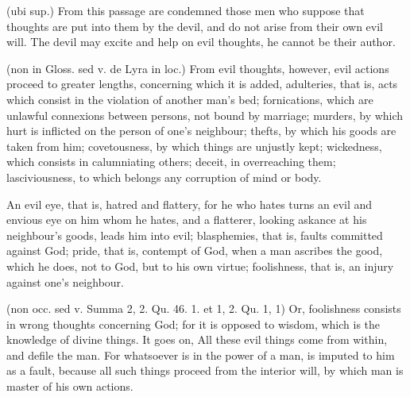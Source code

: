  (ubi sup.) From this passage are condemned those men who suppose that thoughts are put into them by the devil, and do not arise from their own evil will. The devil may excite and help on evil thoughts, he cannot be their author.

 (non in Gloss. sed v. de Lyra in loc.) From evil thoughts, however, evil actions proceed to greater lengths, concerning which it is added, adulteries, that is, acts which consist in the violation of another man’s bed; fornications, which are unlawful connexions between persons, not bound by marriage; murders, by which hurt is inflicted on the person of one’s neighbour; thefts, by which his goods are taken from him; covetousness, by which things are unjustly kept; wickedness, which consists in calumniating others; deceit, in overreaching them; lasciviousness, to which belongs any corruption of mind or body.

 An evil eye, that is, hatred and flattery, for he who hates turns an evil and envious eye on him whom he hates, and a flatterer, looking askance at his neighbour’s goods, leads him into evil; blasphemies, that is, faults committed against God; pride, that is, contempt of God, when a man ascribes the good, which he does, not to God, but to his own virtue; foolishness, that is, an injury against one’s neighbour.

 (non occ. sed v. Summa 2, 2. Qu. 46. 1. et 1, 2. Qu. 1, 1) Or, foolishness consists in wrong thoughts concerning God; for it is opposed to wisdom, which is the knowledge of divine things. It goes on, All these evil things come from within, and defile the man. For whatsoever is in the power of a man, is imputed to him as a fault, because all such things proceed from the interior will, by which man is master of his own actions.

 

